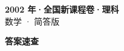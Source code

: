 \documentclass[zihao=-4, a4paper]{ctexart}
\begin{document}
\begin{center}
  {\Large\bfseries 2002 年·全国新课程卷·理科}\\[4pt]
  {\large 数学 · 简答版}
\end{center}
\medskip
{}

\clearpage
{}
\begin{center}{\Large\bfseries 答案速查}\end{center}
\medskip

\end{document}
